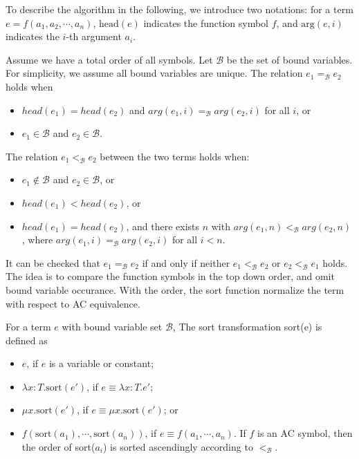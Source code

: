 \documentclass[runningheads]{llncs}
\begin{document}
To describe the algorithm in the following, we introduce two notations: for a term $e = f(a_1, a_2, \cdots, a_n)$, $\textrm{head}(e)$ indicates the function symbol $f$,
and $\textrm{arg}(e, i)$ indicates the $i$-th argument $a_i$. 
\begin{definition}
    Assume we have a total order of all symbols.
    Let $\mathcal{B}$ be the set of bound variables.
    For simplicity, we assume all bound variables are unique.
    The relation $e_1 =_\mathcal{B} e_2$ holds when
    \begin{itemize}
        \item $head(e_1) = head(e_2)$ and $arg(e_1, i) =_\mathcal{B} arg(e_2, i)$ for all $i$, or
        \item $e_1 \in \mathcal{B}$ and $e_2 \in \mathcal{B}$.
    \end{itemize} 

    The relation $e_1 <_\mathcal{B} e_2$ between the two terms holds when:
    \begin{itemize}
        \item $e_1 \notin \mathcal{B}$ and $e_2 \in \mathcal{B}$, or
        \item $head(e_1) < head(e_2)$, or
        \item $head(e_1) = head(e_2)$, and there exists $n$ with $arg(e_1, n) <_\mathcal{B} arg(e_2, n)$, where $arg(e_1, i) =_\mathcal{B} arg(e_2, i)$ for all $i < n$.
    \end{itemize}
\end{definition}
It can be checked that $e_1 =_\mathcal{B} e_2$ if and only if neither $e_1 <_\mathcal{B} e_2$ or $e_2 <_\mathcal{B} e_1$ holds.
The idea is to compare the function symbols in the top down order, and omit bound variable occurance. 
With the order, the sort function normalize the term with respect to AC equivalence.
\begin{definition}
    For a term $e$ with bound variable set $\mathcal{B}$,
    The sort transformation sort(e) is defined as
    \begin{itemize}
        \item $e$, if $e$ is a variable or constant;
        \item $\lambda x:T. \textrm{sort}(e')$, if $e \equiv \lambda x : T. e'$;
        \item $\mu x. \textrm{sort}(e')$, if $e \equiv \mu x. \textrm{sort}(e')$; or
        \item $f(\textrm{sort}(a_1), \cdots, \textrm{sort}(a_n))$, if $e \equiv f(a_1, \cdots, a_n)$. If $f$ is an AC symbol, then the order of sort($a_i$) is sorted ascendingly according to $<_\mathcal{B}$.
    \end{itemize}
\end{definition}
\end{document}
